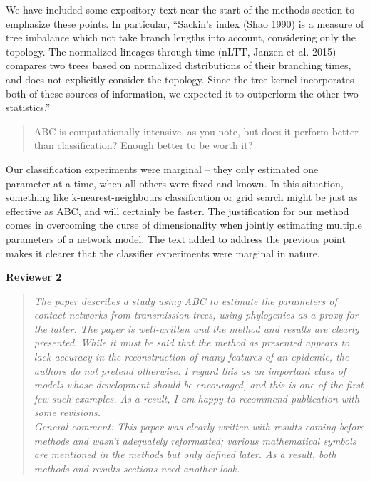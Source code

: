 \documentclass[12pt]{letter}
\begin{document}
\begin{letter}{ }
We have included some expository text near the start of the methods section to
emphasize these points. In particular, ``Sackin's index (Shao 1990)
is a measure of tree imbalance which not take branch lengths into account,
considering only the topology. The normalized lineages-through-time (nLTT,
Janzen et al. 2015) compares two trees based on normalized distributions of
their branching times, and does not explicitly consider the topology. Since the
tree kernel incorporates both of these sources of information, we expected it
to outperform the other two statistics.''

\begin{quote}
  \itshape

  ABC is computationally intensive, as you note, but does it perform better
  than classification? Enough better to be worth it?
\end{quote}

Our classification experiments were marginal -- they only estimated one
parameter at a time, when all others were fixed and known. In this situation,
something like k-nearest-neighbours classification or grid search might be just
as effective as ABC, and will certainly be faster. The justification for our
method comes in overcoming the curse of dimensionality when jointly estimating
multiple parameters of a network model. The text added to address the previous
point makes it clearer that the classifier experiments were marginal in nature.

\textbf{Reviewer 2}

\begin{quote}
  \itshape
  The paper describes a study using ABC to estimate the parameters of contact
  networks from transmission trees, using phylogenies as a proxy for the
  latter. The paper is well-written and the method and results are clearly
  presented. While it must be said that the method as presented appears to lack
  accuracy in the reconstruction of many features of an epidemic, the authors
  do not pretend otherwise. I regard this as an important class of models whose
  development should be encouraged, and this is one of the first few such
  examples. As a result, I am happy to recommend publication with some
  revisions. \\

  General comment: This paper was clearly written with results coming before
  methods and wasn't adequately reformatted; various mathematical symbols are
  mentioned in the methods but only defined later. As a result, both methods
  and results sections need another look.
\end{quote}


\end{letter}
\end{document}
